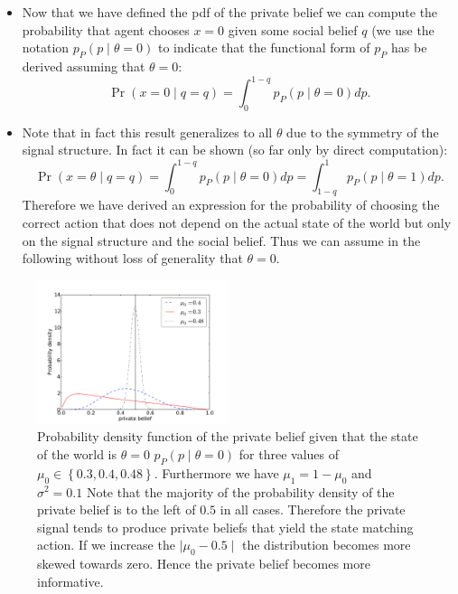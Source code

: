 \documentclass[10pt,a4paper]{article}
\begin{document}
\begin{itemize}
\begin{equation}
\end{equation}
\item Now that we have defined the pdf of the private belief we can compute the probability that agent chooses $x=0$ given some social belief $q$ (we use the notation $p_P(p \mid \theta = 0)$ to indicate that the functional form of $p_P$ has be derived assuming that $\theta = 0$:
\begin{equation}
\Pr(x = 0 \mid q = q) = \int_0^{1-q} p_P(p \mid \theta = 0) dp.
\end{equation}
\item Note that in fact this result generalizes to all $\theta$ due to the symmetry of the signal structure. In fact it can be shown (so far only by direct computation):
\begin{equation}
\Pr(x = \theta \mid q = q) = \int_0^{1-q} p_P(p \mid \theta = 0) dp  =\int_{1-q}^1 p_P(p \mid \theta = 1) dp.
\end{equation}
Therefore we have derived an expression for the probability of choosing the correct action that does not depend on the actual state of the world but only on the signal structure and the social belief. Thus we can assume in the following without loss of generality that $\theta = 0$.
\end{itemize}


\begin{figure}[ht]
\centering
\includegraphics[width=0.5\textwidth]{figures/PRIVATE_BELIEF_DIST}
\caption{Probability density function of the private belief given that the state of the world is $\theta=0$ $p_P(p \mid \theta = 0)$ for three values of $\mu_0 \in \left\lbrace 0.3,0.4,0.48 \right\rbrace$. Furthermore we have $\mu_1 = 1 - \mu_0$ and $\sigma^2 = 0.1$ Note that the majority of the probability density of the private belief is to the left of $0.5$ in all cases. Therefore the private signal tends to produce private beliefs that yield the state matching action. If we increase the $\mid\mu_0 - 0.5\mid$ the distribution becomes more skewed towards zero. Hence the private belief becomes more informative.}
\end{figure}
\end{document}
